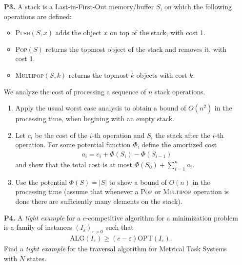 \documentclass[11pt, spanish]{article}
\theoremstyle{plain}
\begin{document}
\begin{itemize}
      \item[\textbf{P3.}] A stack is a Last-in-First-Out memory/buffer $S$, on which
	the following operations are defined:
	\begin{itemize}
	  \item \textsc{Push}$(S,x)$ adds the object $x$ on top of the stack,
	    with cost 1.
	  \item \textsc{Pop}$(S)$ returns the topmost object of the stack
	    and removes it, with cost 1.
	  \item \textsc{Multipop}$(S,k)$ returns the topmost $k$ objects with cost $k$.
	\end{itemize}
	We analyze the cost of processing a sequence of $n$ stack operations.
	\begin{enumerate}
	  \item Apply the usual worst case analysis to obtain a bound of $O(n^2)$ in
	    the processing time, when begining with an empty stack.
	  \item Let $c_i$ be the cost of the $i$-th operation and $S_i$ the stack
	    after the $i$-th operation. For some potential function $\Phi$, define
	    the amortized cost
	    \begin{align*}
	      a_i= c_i + \Phi(S_i) - \Phi(S_{i-1})
	    \end{align*}
	    and show that the total cost is at most $\Phi(S_0) + \sum_{i=1}^n a_i$.
	  \item Use the potential $\Phi(S)= |S|$ to show a bound of $O(n)$ in the
	    processing time (assume that whenever a \textsc{Pop} or \textsc{Multipop}
	    operation is done there are sufficiently many elements on the stack).
	\end{enumerate}

      \item[\textbf{P4.}] A \textit{tight example} for a $c$-competitive algorithm
	for a minimization problem is a family of instances $(I_\varepsilon)_{\varepsilon>0}$
	 such that
	\begin{align*}
	  \text{ALG}(I_\varepsilon) \geq (c- \varepsilon) \text{OPT}(I_\varepsilon).
	\end{align*}
	Find a \textit{tight example} for the traversal algorithm for Metrical Task
	Systems with $N$ states.


\end{itemize}
\end{document}
